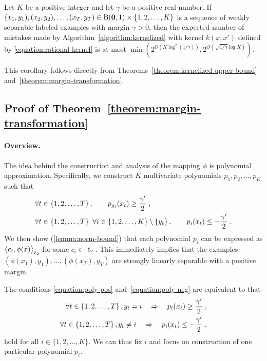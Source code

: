 \begin{corollary}
\label{corollary:weakly-separable-examples-mistake-upper-bound}
Let $K$ be a positive integer and let $\gamma$ be a positive real number. If
$(x_1, y_1), (x_2, y_2), \dots, (x_T, y_T) \in \operatorname{B}(\mathbf{0},1) \times \{1,2,\dots,K\}$
is a sequence of weakly separable labeled examples with margin $\gamma > 0$,
then the expected number of mistakes made by Algorithm~\ref{algorithm:kernelized}
with kernel $k(x,x')$ defined by \eqref{equation:rational-kernel}
is at most $\min (2^{\widetilde{O}(K \log^2
(1/\gamma))}, 2^{\widetilde{O}(\sqrt{1/\gamma} \log K)})$.
\end{corollary}

This corollary follows directly from
Theorems~\ref{theorem:kernelized-upper-bound}
and~\ref{theorem:margin-transformation}.

\subsection{Proof of Theorem~\ref{theorem:margin-transformation}}
\label{section:margin-transformation}

\paragraph{Overview.} The idea behind the construction and analysis of the
mapping $\phi$ is polynomial approximation. Specifically, we construct $K$
multivariate polynomials $p_1, p_2, \dots,p_K$ such that
\begin{align}
\label{equation:poly-pos}
& \forall t \in \cbr{1,2,\dots,T}, \qquad p_{y_t}(x_t) \ge \frac{\gamma'}{2} \; ,
\\
\label{equation:poly-neg}
& \begin{gathered}
\forall t \in \cbr{1,2,\dots,T} \ \forall i \in \cbr{1,2,\ldots,K} \setminus \cbr{y_t}, \qquad
p_i(x_t) \le - \frac{\gamma'}{2} \; .
\end{gathered}
\end{align}
We then show (\autoref{lemma:norm-bound}) that each polynomial $p_i$ can be
expressed as $\left\langle c_i, \phi(x) \right\rangle_{\ell_2}$ for some $c_i \in \ell_2$. This
immediately implies that the examples $(\phi(x_1),y_1), \ldots,
(\phi(x_T),y_T)$ are strongly linearly separable with a positive margin.

The conditions \eqref{equation:poly-pos} and~\eqref{equation:poly-neg} are
equivalent to that
\begin{align}
\label{equation:poly-pos-i}
\forall t \in \cbr{1,2,\dots,T}, y_t = i \quad \Rightarrow \quad p_i(x_t) \ge \frac{\gamma'}{2} \; , \\
\label{equation:poly-neg-i}
\forall t \in \cbr{1,2,\dots,T}, y_t \neq i \quad \Rightarrow \quad p_i(x_t) \le -\frac{\gamma'}{2} \; .
\end{align}
hold for all $i \in \{1,2,\dots,K\}$. We can thus fix $i$ and focus on
construction of one particular polynomial $p_i$.

